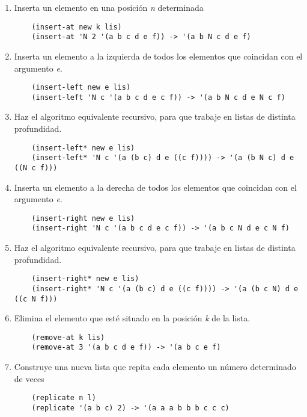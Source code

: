 \documentclass[11pt]{article}
\begin{document}
\begin{enumerate}
  \item Inserta un elemento en una posición \textit{n} determinada
\begin{verbatim}
    (insert-at new k lis)
    (insert-at 'N 2 '(a b c d e f)) -> '(a b N c d e f)
\end{verbatim}

  \item Inserta un elemento a la izquierda de todos los elementos que coincidan con el argumento \textit{e}.
\begin{verbatim}
    (insert-left new e lis)
    (insert-left 'N c '(a b c d e c f)) -> '(a b N c d e N c f)
\end{verbatim}

  \item Haz el algoritmo equivalente recursivo, para que trabaje en listas de distinta profundidad.
\begin{verbatim}
    (insert-left* new e lis)
    (insert-left* 'N c '(a (b c) d e ((c f)))) -> '(a (b N c) d e ((N c f)))
\end{verbatim}

  \item Inserta un elemento a la derecha de todos los elementos que coincidan con el argumento \textit{e}.
\begin{verbatim}
    (insert-right new e lis)
    (insert-right 'N c '(a b c d e c f)) -> '(a b c N d e c N f)
\end{verbatim}

  \item Haz el algoritmo equivalente recursivo, para que trabaje en listas de distinta profundidad.
\begin{verbatim}
    (insert-right* new e lis)
    (insert-right* 'N c '(a (b c) d e ((c f)))) -> '(a (b c N) d e ((c N f)))
\end{verbatim}

  \item Elimina el elemento que esté situado en la posición \textit{k} de la lista.
\begin{verbatim}
    (remove-at k lis)
    (remove-at 3 '(a b c d e f)) -> '(a b c e f)
\end{verbatim}

  \item Construye una nueva lista que repita cada elemento un número determinado de veces
\begin{verbatim}
    (replicate n l)
    (replicate '(a b c) 2) -> '(a a a b b b c c c)
\end{verbatim}


\end{enumerate}
\end{document}
